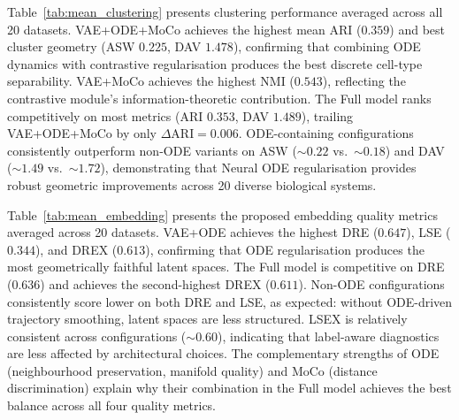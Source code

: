 \documentclass[preprint,12pt,number]{elsarticle}
\begin{document}
Table~\ref{tab:mean_clustering} presents clustering performance averaged across all 20 datasets. VAE+ODE+MoCo achieves the highest mean ARI ($0.359$) and best cluster geometry (ASW $0.225$, DAV $1.478$), confirming that combining ODE dynamics with contrastive regularisation produces the best discrete cell-type separability. VAE+MoCo achieves the highest NMI ($0.543$), reflecting the contrastive module's information-theoretic contribution. The Full model ranks competitively on most metrics (ARI $0.353$, DAV $1.489$), trailing VAE+ODE+MoCo by only $\Delta\text{ARI}{=}0.006$. ODE-containing configurations consistently outperform non-ODE variants on ASW (${\sim}0.22$ vs.\ ${\sim}0.18$) and DAV (${\sim}1.49$ vs.\ ${\sim}1.72$), demonstrating that Neural ODE regularisation provides robust geometric improvements across 20 diverse biological systems.

\begin{table}[!t]
    \centering
    \caption{Cross-dataset mean clustering metrics (20 datasets, split=whole). Best per column in \textbf{bold}. DAV$\downarrow$ indicates lower is better.}
    \label{tab:mean_clustering}
\end{table}

Table~\ref{tab:mean_embedding} presents the proposed embedding quality metrics averaged across 20 datasets. VAE+ODE achieves the highest DRE ($0.647$), LSE ($0.344$), and DREX ($0.613$), confirming that ODE regularisation produces the most geometrically faithful latent spaces. The Full model is competitive on DRE ($0.636$) and achieves the second-highest DREX ($0.611$). Non-ODE configurations consistently score lower on both DRE and LSE, as expected: without ODE-driven trajectory smoothing, latent spaces are less structured. LSEX is relatively consistent across configurations (${\sim}0.60$), indicating that label-aware diagnostics are less affected by architectural choices. The complementary strengths of ODE (neighbourhood preservation, manifold quality) and MoCo (distance discrimination) explain why their combination in the Full model achieves the best balance across all four quality metrics.
\end{document}

